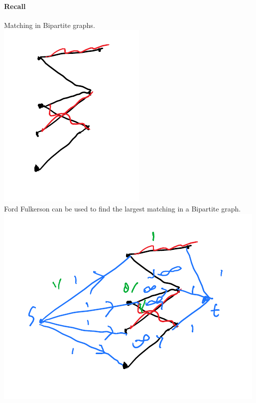 \documentclass[12 pt]{article}
\begin{document}
        \paragraph{Recall} Matching in Bipartite graphs.
        \\ \includegraphics[width=.9\textwidth]{i61.pdf}
        \\ Ford Fulkerson can be used to find the largest matching in
        a Bipartite graph.
        \\ \includegraphics[width=.9\textwidth]{i62.pdf}
\end{document}
